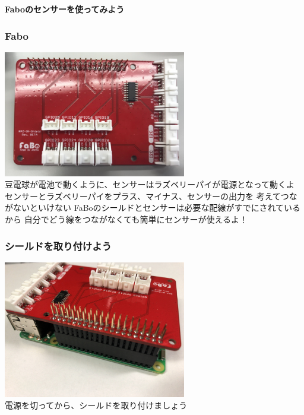 \begin{frame}[plain]
    \begin{center}
        \vspace{48pt}
        {\huge\bf Faboのセンサーを使ってみよう}
    \end{center}
\end{frame}

\begin{frame}
    \frametitle{Fabo}
    \begin{center}
        \includegraphics[width=0.6\textwidth]{images/chap05/text05-img004.png}
        {\\豆電球が電池で動くように、センサーはラズベリーパイが電源となって動くよ
        センサーとラズベリーパイをプラス、マイナス、センサーの出力を
        考えてつながないといけない
        FaBoのシールドとセンサーは必要な配線がすでにされているから
        自分でどう線をつながなくても簡単にセンサーが使えるよ！} 
    \end{center}
\end{frame}

\begin{frame}
    \frametitle{シールドを取り付けよう}
    \begin{center}
        \includegraphics[width=0.6\textwidth]{images/chap05/text05-img006.jpg}
        {\\\color{red}電源を切ってから\color{black}、シールドを取り付けましょう}
    \end{center}
\end{frame}


